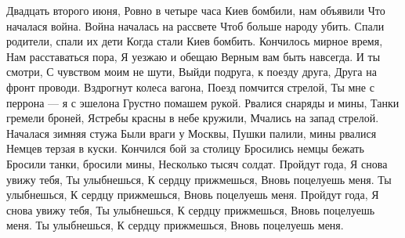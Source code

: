 \raggedcolumns
\begin{multicols}{3} %
\setlength{\parindent}{0pt}

\obeycr
Двадцать второго июня,
Ровно в четыре часа
Киев бомбили, нам объявили
Что началася война.
\smallskip
Война началась на рассвете
Чтоб больше народу убить.
Спали родители, спали их дети
Когда стали Киев бомбить.
\smallskip
Кончилось мирное время,
Нам расставаться пора,
Я уезжаю и обещаю
Верным вам быть навсегда.
\smallskip
И ты смотри,
С чувством моим не шути,
Выйди подруга, к поезду друга,
Друга на фронт проводи.
\smallskip
Вздрогнут колеса вагона,
Поезд помчится стрелой,
Ты мне с перрона — я с эшелона
Грустно помашем рукой.
\smallskip
Рвалися снаряды и мины,
Танки гремели броней,
Ястребы красны в небе кружили,
Мчались на запад стрелой.
\smallskip
Началася зимняя стужа
Были враги у Москвы,
Пушки палили, мины рвалися
Немцев терзая в куски.
\smallskip
Кончился бой за столицу
Бросились немцы бежать
Бросили танки, бросили мины,
Несколько тысяч солдат.
\smallskip
Пройдут года,
Я снова увижу тебя,
Ты улыбнешься,
К сердцу прижмешься,
Вновь поцелуешь меня.
Ты улыбнешься,
К сердцу прижмешься,
Вновь поцелуешь меня.
\smallskip
Пройдут года,
Я снова увижу тебя,
Ты улыбнешься,
К сердцу прижмешься,
Вновь поцелуешь меня.
Ты улыбнешься,
К сердцу прижмешься,
Вновь поцелуешь меня. 
\restorecr
\end{multicols} %
